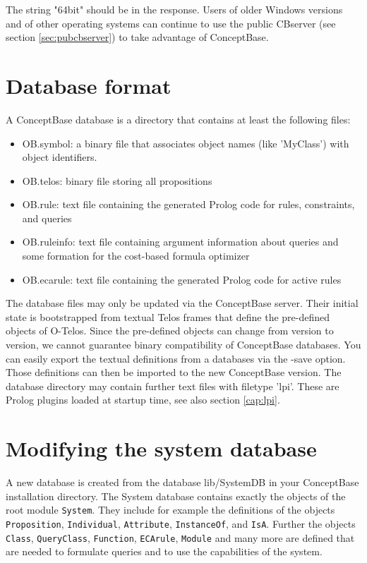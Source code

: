 The string "64bit" should be in the response. Users of older Windows versions and of other operating systems can continue to use the
public CBserver (see section \ref{sec:pubcbserver}) to take advantage of ConceptBase.



\section{Database format}

A ConceptBase database is a directory that contains at least the following files:

\begin{itemize}
\item OB.symbol: a binary file that associates object names (like 'MyClass') with
object identifiers. 
\item OB.telos: binary file storing all propositions
\item OB.rule: text file containing the generated Prolog code for rules, constraints,
and queries
\item OB.ruleinfo: text file containing argument information about queries and some
formation for the cost-based formula optimizer
\item OB.ecarule: text file containing the generated Prolog code for active rules
\end{itemize}

The database files may only be updated via the ConceptBase server. Their
initial state is bootstrapped from textual Telos frames that define the
pre-defined objects of O-Telos.  Since the pre-defined objects can change
from version to version, we cannot guarantee binary compatibility of 
ConceptBase databases. You can easily export the textual definitions from
a databases via the -save option. Those definitions can then be 
imported to the new ConceptBase version.
The database directory may contain further text files with filetype 'lpi'. These are
Prolog plugins loaded at startup time, see also section \ref{cap:lpi}.


\section{Modifying the system database}

A new database is created from the database lib/SystemDB in your ConceptBase
installation directory. The System database contains exactly the objects
of the root module {\tt System}. They include for example the definitions
of the objects {\tt Proposition}, {\tt Individual},  {\tt Attribute},
 {\tt InstanceOf}, and  {\tt IsA}. Further the objects {\tt Class},
 {\tt QueryClass},  {\tt Function},  {\tt ECArule},  {\tt Module}
and many more are defined that are needed to formulate queries and
to use the capabilities of the system. 

